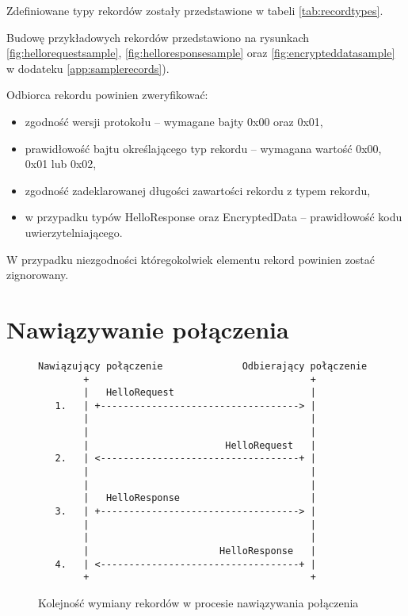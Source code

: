 Zdefiniowane typy rekordów zostały przedstawione w tabeli \ref{tab:recordtypes}.

Budowę przykładowych rekordów przedstawiono na rysunkach \ref{fig:hellorequestsample}, \ref{fig:helloresponsesample} oraz \ref{fig:encrypteddatasample} w dodateku \ref{app:samplerecords}).

Odbiorca rekordu powinien zweryfikować:

\begin{itemize}
\item zgodność wersji protokołu -- wymagane bajty 0x00 oraz 0x01,
\item prawidłowość bajtu określającego typ rekordu -- wymagana wartość 0x00, 0x01 lub 0x02,
\item zgodność zadeklarowanej długości zawartości rekordu z typem rekordu,
\item w przypadku typów HelloResponse oraz EncryptedData -- prawidłowość kodu uwierzytelniającego.
\end{itemize}

W przypadku niezgodności któregokolwiek elementu rekord powinien zostać zignorowany.

\section{Nawiązywanie połączenia}

\begin{figure}
\centering
\begin{BVerbatim}
Nawiązujący połączenie              Odbierający połączenie
        +                                       +
        |   HelloRequest                        |
   1.   | +-----------------------------------> |
        |                                       |
        |                                       |
        |                        HelloRequest   |
   2.   | <-----------------------------------+ |
        |                                       |
        |                                       |
        |   HelloResponse                       |
   3.   | +-----------------------------------> |
        |                                       |
        |                                       |
        |                       HelloResponse   |
   4.   | <-----------------------------------+ |
        +                                       +
\end{BVerbatim}
\caption{Kolejność wymiany rekordów w procesie nawiązywania połączenia}
\label{fig:handshake}
\end{figure}

